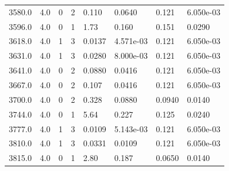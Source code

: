 \documentclass[preview]{standalone}
\begin{document}
{{{\begin{tabular}{L{1.2cm}C{1.2cm} C{0.3cm}C{0.5cm} C{1.4cm}C{1.4cm} C{1.4cm}C{1.4cm}}
  3580.0  &   4.0  & 0     &  2 &  0.110  & 0.0640  & 0.121 &  6.050e-03   \\ 
  3596.0  &   4.0  & 0     &  1 &  1.73  & 0.160  & 0.151 &  0.0290   \\ 
  3618.0  &   4.0  & 1     &  3 &  0.0137  & 4.571e-03  & 0.121 &  6.050e-03   \\ 
  3631.0  &   4.0  & 1     &  3 &  0.0280  & 8.000e-03  & 0.121 &  6.050e-03   \\ 
  3641.0  &   4.0  & 0     &  2 &  0.0880  & 0.0416  & 0.121 &  6.050e-03   \\ 
  3667.0  &   4.0  & 0     &  2 &  0.107  & 0.0416  & 0.121 &  6.050e-03   \\ 
  3700.0  &   4.0  & 0     &  2 &  0.328  & 0.0880  & 0.0940 &  0.0140   \\ 
  3744.0  &   4.0  & 0     &  1 &  5.64  & 0.227  & 0.125 &  0.0240   \\ 
  3777.0  &   4.0  & 1     &  3 &  0.0109  & 5.143e-03  & 0.121 &  6.050e-03   \\ 
  3810.0  &   4.0  & 1     &  3 &  0.0331  & 0.0109  & 0.121 &  6.050e-03   \\ 
  3815.0  &   4.0  & 0     &  1 &  2.80  & 0.187  & 0.0650 &  0.0140   \\ 
\hline 
\end{tabular} 

}}}
\end{document}
